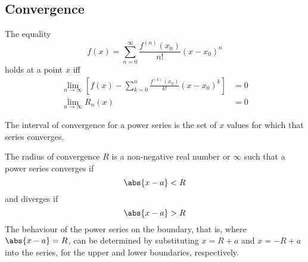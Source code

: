\documentclass{article}
\begin{document}
\subsection{Convergence}
\begin{theorem}
    The equality
    \begin{equation*}
        f\left( x \right) = \sum_{n=0}^{\infty} \frac{f^{\left( n \right)}\left( x_0 \right)}{n!} \left( x-x_0 \right)^n
    \end{equation*}
    holds at a point \(x\) iff
    \begin{align*}
        \lim_{n\to\infty} \left[ f\left( x \right) - \sum_{k=0}^{n} \frac{f^{\left( k \right)}\left( x_0 \right)}{k!} \left( x-x_0 \right)^k \right] & = 0 \\
        \lim_{n\to\infty} R_n\left( x \right)                                                                                                        & = 0
    \end{align*}
\end{theorem}
\begin{definition}
    The interval of convergence for a power series is the set of \(x\)
    values for which that series converges.
\end{definition}
\begin{definition}
    The radius of convergence \(R\) is a non-negative real number or
    \(\infty\) such that a power series converges if
    \begin{equation*}
        \abs{x - a} < R
    \end{equation*}
    and diverges if
    \begin{equation*}
        \abs{x - a} > R
    \end{equation*}
    The behaviour of the power series on the boundary, that is, where
    \(\abs{x - a} = R\), can be determined by substituting \(x = R + a\)
    and \(x = -R + a\) into the series, for the upper and lower
    boundaries, respectively.
\end{definition}
\end{document}
